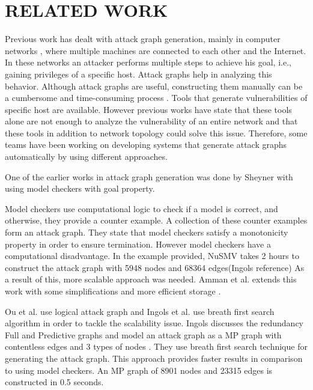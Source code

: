 \section{RELATED WORK}
Previous work has dealt with attack graph generation, mainly in computer networks 
, where multiple machines are connected to each other and the Internet. In these networks an attacker performs multiple steps to achieve his goal, i.e., gaining privileges of a specific host. Attack graphs help in analyzing this behavior. Although attack graphs are useful, constructing them manually can be a cumbersome and time-consuming process
. Tools that generate vulnerabilities of specific host are available. However previous works have state that these tools alone are not enough to analyze the vulnerability 
of an entire network and that these tools in addition to network topology could solve this issue. Therefore, some teams have been  working on developing systems that generate attack graphs automatically by using different approaches.

One of the earlier works in attack graph generation was done by Sheyner with using model checkers with goal property.\cite{ingols2006practical} %

Model checkers use computational logic to check if a model is correct, and otherwise, they provide a counter example. A collection of these counter examples form an attack graph. They state that model checkers satisfy a monotonicity property in order to ensure termination. However model checkers have a computational disadvantage. In the example provided, NuSMV takes 2 hours to construct the attack graph with 5948 nodes and 68364 edges(Ingols reference) As a result of this, more scalable approach was needed. Amman et al. extends this work with some simplifications and more efficient storage \cite{ritchey2000using}.

Ou et al. use logical attack graph \cite{ou2006scalable} and Ingols \cite{ingols2006practical} et al. use breath first search algorithm in order to tackle the scalability issue. Ingols discusses the redundancy Full and Predictive graphs and model an attack graph as a MP graph with contentless edges and 3 types of nodes
. They use breath first search technique for generating the attack graph. This approach provides faster results in comparison to using model checkers. An MP graph of 8901 nodes and 23315 edges is constructed in 0.5 seconds.

